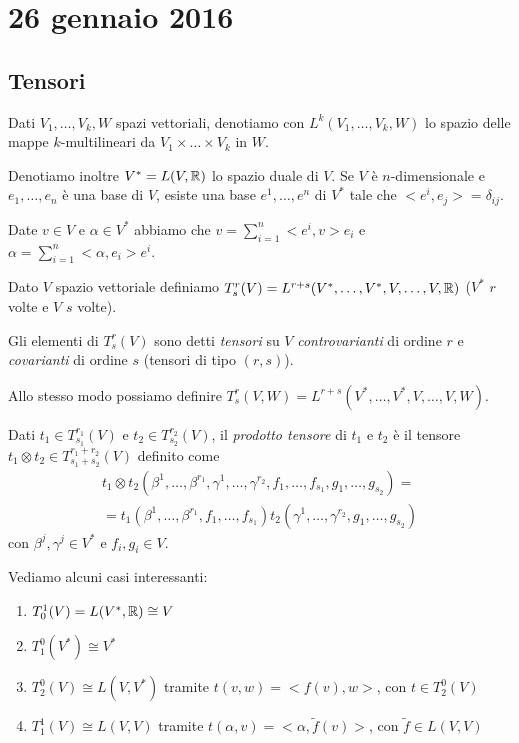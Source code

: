 \chapter{26 gennaio 2016}

\section{Tensori}
Dati $V_1,\dots,V_k,W$ spazi vettoriali, denotiamo con $L^k(V_1,\dots,V_k,W)$ lo spazio delle mappe $k$-multilineari da $V_1\times\dots\times V_k$ in $W$.

Denotiamo inoltre $V^* = L(V,\mathbb R)$ lo spazio duale di $V$.
Se $V$ è $n$-dimensionale e $e_1,\dots,e_n$ è una base di $V$, esiste una base $e^1,\dots,e^n$ di $V^*$ tale che $<e^i,e_j> = \delta_{ij}$.

Date $v\in V$ e $\alpha \in V^*$ abbiamo che $v= \sum_{i=1}^n <e^i,v> e_i$ e $\alpha= \sum_{i=1}^n <\alpha,e_i> e^i$.

\begin{definition}
	Dato $V$ spazio vettoriale definiamo $T_s^r(V) = L^{r+s} (V^*,\dots,V^*,V,\dots,V,\mathbb R)$ ($V^*$ $r$ volte e $V$ $s$ volte).
	
	Gli elementi di $T_s^r(V)$ sono detti \emph{tensori} su $V$ \emph{controvarianti} di ordine $r$ e \emph{covarianti} di ordine $s$ (tensori di tipo $(r,s)$).
\end{definition}

\begin{remark}
	Allo stesso modo possiamo definire $T_s^r(V,W) = L^{r+s} (V^*,\dots,V^*,V,\dots,V,W)$.
\end{remark}


\begin{definition}
	Dati $t_1\in T_{s_1}^{r_1}(V)$ e $t_2\in T_{s_2}^{r_2}(V)$, il \emph{prodotto tensore} di $t_1$ e $t_2$ è il tensore $t_1\otimes t_2 \in T_{s_1+s_2}^{r_1+r_2}(V)$ definito come 
	\begin{multline*}
		t_1\otimes t_2(\beta^1,\dots,\beta^{r_1},\gamma^1,\dots,\gamma^{r_2}, f_1,\dots,f_{s_1},g_1,\dots,g_{s_2}) =\\
		=t_1(\beta^1,\dots,\beta^{r_1},f_1,\dots,f_{s_1})t_2(\gamma^1,\dots,\gamma^{r_2},g_1,\dots,g_{s_2})
	\end{multline*}
	con $\beta^j,\gamma^j\in V^*$ e $f_i,g_i\in V$.
\end{definition}

\begin{example}
	Vediamo alcuni casi interessanti:
	\begin{enumerate}
		\item $T_0^1(V) = L(V^*,\mathbb R) \cong V$
		\item $T_1^0(V^*) \cong V^*$
		\item $T_2^0(V) \cong L(V,V^*)$ tramite $t(v,w) = <f(v),w>$, con $t\in T_2^0(V)$
		\item $T_1^1(V) \cong L(V,V)$ tramite $t(\alpha,v) = <\alpha, \tilde f (v)>$, con $\tilde f\in L(V,V)$
	\end{enumerate}
\end{example}

